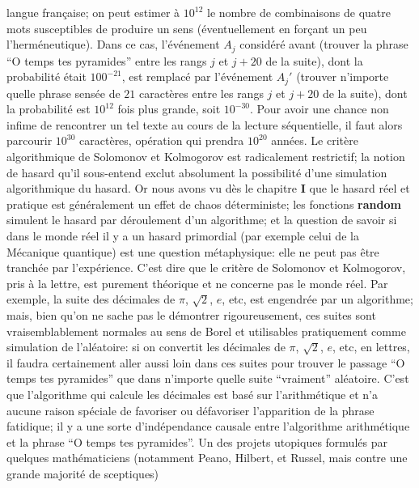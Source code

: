 langue fran\c{c}aise;  on peut estimer \`a $10^{12}$ le nombre de
combinaisons de quatre mots susceptibles de produire un sens
(\'eventuellement en for\c{c}ant un peu l'herm\'eneutique).  Dans ce
cas,  l'\'ev\'enement $A_j$ consid\'er\'e avant (trouver la phrase ``O 
temps  tes pyramides'' entre les rangs $j$ et $j+20$ de la suite),  dont la
probabilit\'e \'etait $100^{-21}$,  est remplac\'e par l'\'ev\'enement 
$A_j'$ (trouver n'importe quelle phrase sens\'ee de $21$ caract\`eres
entre les rangs $j$ et $j+20$ de la suite),  dont la
probabilit\'e est $10^{12}$ fois plus grande,  soit $10^{-30}$.  Pour avoir 
une chance non infime de rencontrer un tel texte au cours de la lecture 
s\'equentielle,  il faut alors parcourir $10^{30}$ caract\`eres,  op\'eration 
qui prendra $10^{20}$ ann\'ees.
\medskip
Le crit\`ere algorithmique de Solomonov et Kolmogorov est radicalement
restrictif;  la notion de hasard qu'il sous-entend exclut absolument la
possibilit\'e d'une simulation algorithmique du hasard.  Or nous avons 
vu d\`es le chapitre {\bf I} que le hasard r\'eel et pratique est
g\'en\'eralement un effet de chaos d\'eterministe;  les fonctions 
{\bf random} simulent le hasard par d\'eroulement d'un algorithme; 
et la question de savoir si dans le monde r\'eel il y a un hasard 
primordial (par exemple celui de la M\'ecanique quantique) est une 
question m\'etaphysique:  elle ne peut pas \^etre tranch\'ee par
l'exp\'erience.  C'est dire que le crit\`ere de Solomonov 
et Kolmogorov,  pris \`a la lettre,  est purement th\'eorique et ne 
concerne pas le monde r\'eel.  Par exemple,  la suite des d\'ecimales de 
$\pi$,  $\sqrt{2}$,  $e$, etc,  est engendr\'ee par un algorithme;  mais, 
bien qu'on ne sache pas le d\'emontrer rigoureusement,  ces suites sont
vraisemblablement normales au sens de Borel et utilisables pratiquement 
comme simulation de l'al\'eatoire:  si on convertit les d\'ecimales de 
$\pi$, $\sqrt{2}$, $e$, etc, en lettres,  il faudra certainement aller aussi 
loin dans ces suites pour trouver le passage ``O temps tes pyramides'' 
que dans n'importe quelle suite ``vraiment'' al\'eatoire. 
\medskip
C'est que l'algorithme qui calcule les d\'ecimales est bas\'e sur
l'arithm\'etique et n'a aucune raison sp\'eciale de favoriser ou
d\'efavoriser l'apparition de la phrase fatidique;  il y a une sorte
d'ind\'ependance causale entre l'algorithme arithm\'etique et la
phrase ``O temps tes pyramides''.
\medskip
Un des projets utopiques formul\'es par quelques math\'ematiciens (notamment 
Peano,  Hilbert,  et Russel,  mais contre une grande majorit\'e de sceptiques)
